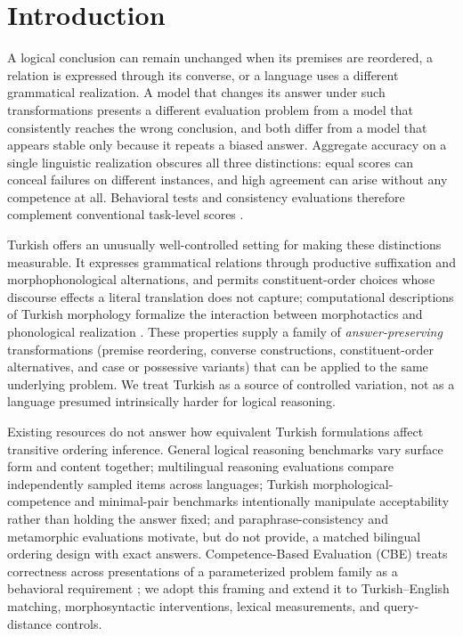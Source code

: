 \section{Introduction}

A logical conclusion can remain unchanged when its premises are reordered, a relation is expressed through
its converse, or a language uses a different grammatical realization. A model that changes its answer under
such transformations presents a different evaluation problem from a model that consistently reaches the
wrong conclusion, and both differ from a model that appears stable only because it repeats a biased answer.
Aggregate accuracy on a single linguistic realization obscures all three distinctions: equal scores can
conceal failures on different instances, and high agreement can arise without any competence at all.
Behavioral tests and consistency evaluations therefore complement conventional task-level scores
\citep{ribeiro2020checklist, elazar2021pararel}.

Turkish offers an unusually well-controlled setting for making these distinctions measurable. It expresses
grammatical relations through productive suffixation and morphophonological alternations, and permits
constituent-order choices whose discourse effects a literal translation does not capture; computational
descriptions of Turkish morphology formalize the interaction between morphotactics and phonological
realization \citep{oflazer1994turkish}. These properties supply a family of \emph{answer-preserving}
transformations (premise reordering, converse constructions, constituent-order alternatives, and case or
possessive variants) that can be applied to the same underlying problem. We treat Turkish as a source
of controlled variation, not as a language presumed intrinsically harder for logical reasoning.

Existing resources do not answer how equivalent Turkish formulations affect transitive ordering inference.
General logical reasoning benchmarks \citep{yu2020reclor, liu2020logiqa, han2024folio} vary surface form
and content together; multilingual reasoning evaluations \citep{shi2023mgsm} compare independently sampled
items across languages; Turkish morphological-competence and minimal-pair benchmarks
\citep{ismayilzada2025morphology, basar2025turblimp, basar2026morphologyaware} intentionally manipulate
acceptability rather than holding the answer fixed; and paraphrase-consistency and metamorphic evaluations
\citep{elazar2021pararel, segura2016metamorphic} motivate, but do not provide, a matched bilingual ordering
design with exact answers. Competence-Based Evaluation (CBE) treats correctness across presentations of a
parameterized problem family as a behavioral requirement \citep{jiang2026cbe}; we adopt this framing and
extend it to Turkish--English matching, morphosyntactic interventions, lexical measurements, and
query-distance controls.

